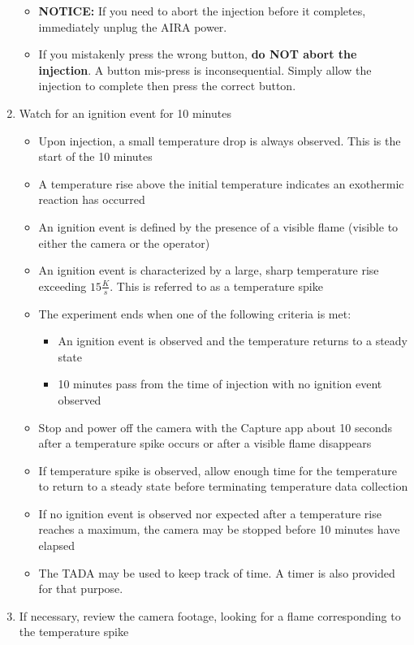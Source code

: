 \begin{enumerate}
  \begin{itemize}
  \tightlist
  \item
    \textbf{NOTICE:} If you need to abort the injection before it
    completes, immediately unplug the AIRA power.
  \item
    If you mistakenly press the wrong button, \textbf{do NOT abort the
    injection}. A button mis-press is inconsequential. Simply allow the
    injection to complete then press the correct button.
  \end{itemize}
\item
  Watch for an ignition event for 10 minutes

  \begin{itemize}
  \tightlist
  \item
    Upon injection, a small temperature drop is always observed. This is
    the start of the 10 minutes
  \item
    A temperature rise above the initial temperature indicates an
    exothermic reaction has occurred
  \item
    An ignition event is defined by the presence of a visible flame
    (visible to either the camera or the operator)
  \item
    An ignition event is characterized by a large, sharp temperature
    rise exceeding \(15 \frac{K}{s}\). This is referred to as a
    temperature spike
  \item
    The experiment ends when one of the following criteria is met:

    \begin{itemize}
    \tightlist
    \item
      An ignition event is observed and the temperature returns to a
      steady state
    \item
      10 minutes pass from the time of injection with no ignition event
      observed
    \end{itemize}
  \item
    Stop and power off the camera with the Capture app about 10 seconds
    after a temperature spike occurs or after a visible flame disappears
  \item
    If temperature spike is observed, allow enough time for the
    temperature to return to a steady state before terminating
    temperature data collection
  \item
    If no ignition event is observed nor expected after a temperature
    rise reaches a maximum, the camera may be stopped before 10 minutes
    have elapsed
  \item
    The TADA may be used to keep track of time. A timer is also provided
    for that purpose.
  \end{itemize}
\item
  If necessary, review the camera footage, looking for a flame
  corresponding to the temperature spike


\end{enumerate}
